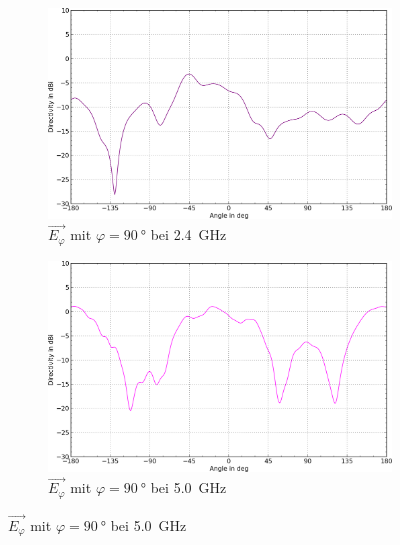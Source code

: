 \begin{figure}[h!]
	\begin{subfigure}[b]{0.48\textwidth}
		\includegraphics[width=1\textwidth]{../fig/plt/crazy_stuff_l4_pcb_v2c_laptop_1a_105_2ghz4_ephi_phi90-trim.png}
		\caption{$\vec{E_{\varphi}}$ mit $\varphi=\SI{90}{\degree}$ bei \SI{2.4}{\giga\hertz}}
	\end{subfigure}
	\begin{subfigure}[b]{0.48\textwidth}
		\includegraphics[width=1\textwidth]{../fig/plt/crazy_stuff_l4_pcb_v2c_laptop_1a_105_5ghz0_ephi_phi90-trim.png}
		\caption{$\vec{E_{\varphi}}$ mit $\varphi=\SI{90}{\degree}$ bei \SI{5.0}{\giga\hertz}}
	\end{subfigure}


\end{figure}

